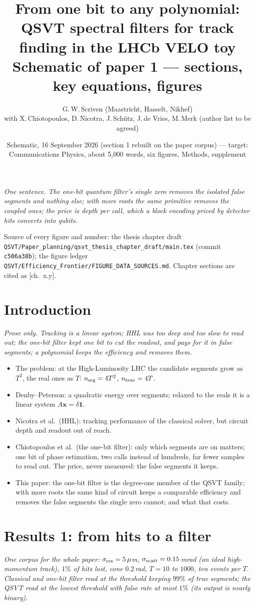 \documentclass[11pt,a4paper]{article}
\title{\vspace{-1.5cm}From one bit to any polynomial:\\ QSVT spectral filters for track finding in the LHCb VELO toy\\[4pt]
\large Schematic of paper 1 --- sections, key equations, figures}
\author{G.\,W.\,Scriven (Maastricht, Hasselt, Nikhef)\\ \normalsize with X.\,Chiotopoulos, D.\,Nicotra, J.\,Sch\"utz, J.\,de Vries, M.\,Merk (author list to be agreed)}
\date{Schematic, 16 September 2026 (section 1 rebuilt on the paper corpus) --- target: Communications Physics, about 5{,}000 words, six figures, Methods, supplement}
\newcommand{\msg}[1]{\noindent\textit{\color{blue!50!black}#1}\par\medskip}
\newcommand{\src}[1]{{\footnotesize\color{gray}#1}}
\begin{document}
\maketitle
\vspace{-8pt}
\msg{One sentence. The one-bit quantum filter's single zero removes the isolated false segments and nothing else; with more roots the same primitive removes the coupled ones; the price is depth per call, which a block encoding priced by detector hits converts into qubits.}
\src{Source of every figure and number: the thesis chapter draft \texttt{QSVT/Paper\_planning/qsvt\_thesis\_chapter\_draft/main.tex} (commit \texttt{c506a38b}); the figure ledger \texttt{QSVT/Efficiency\_Frontier/FIGURE\_DATA\_SOURCES.md}. Chapter sections are cited as [ch.~x.y].}

\section{Introduction}
\msg{Prose only. Tracking is a linear system; HHL was too deep and too slow to read out; the one-bit filter kept one bit to cut the readout, and pays for it in false segments; a polynomial keeps the efficiency and removes them.}
\begin{itemize}[leftmargin=1.5em,itemsep=2pt]
\item The problem: at the High-Luminosity LHC the candidate segments grow as $T^2$, the real ones as $T$: $n_{\rm seg}=4T^2$, $n_{\rm true}=4T$.
\item Denby--Peterson: a quadratic energy over segments; relaxed to the reals it is a linear system $A\mathbf{x}=\delta\mathbf{1}$.
\item Nicotra et al.\ (HHL): tracking performance of the classical solver, but circuit depth and readout out of reach.
\item Chiotopoulos et al.\ (the one-bit filter): only which segments are on matters; one bit of phase estimation, two calls instead of hundreds, far fewer samples to read out. The price, never measured: the false segments it keeps.
\item This paper: the one-bit filter is the degree-one member of the QSVT family; with more roots the same kind of circuit keeps a comparable efficiency and removes the false segments the single zero cannot; and what that costs.
\end{itemize}

\section{Results 1: from hits to a filter}
\msg{One corpus for the whole paper: $\sigma_{\rm res}=5\,\mu$m, $\sigma_{\rm scatt}=0.15$\,mrad (an ideal high-momentum track), $1\%$ of hits lost, cone $0.2$\,rad, $T=10$ to $1000$, ten events per $T$. Classical and one-bit filter read at the threshold keeping $99\%$ of true segments; the QSVT read at the lowest threshold with false rate at most $1\%$ (its output is nearly binary).}
\end{document}
